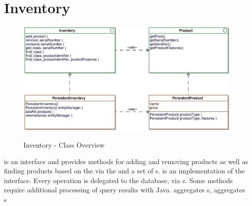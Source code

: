 \newpage
\section{Inventory}
\label{sec:inventory}

\begin{figure}[ht]
	\centering
  \includegraphics[width=1.0\textwidth]{images/Inventory_Overview.eps}
	\label{inventory_overview}
	\caption{Inventory - Class Overview}
\end{figure}


 is an interface and provides methods for adding and removing products as well as finding products based on the  via the  and a set of s.
 is an implementation of the  interface. Every operation is delegated to the database, via s. Some methods require additional processing of query results with Java.
 aggregates s,  aggregates s 

